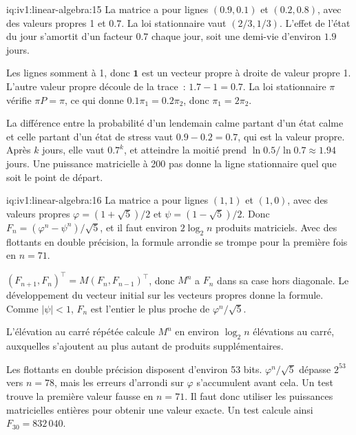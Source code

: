 \begin{solution}{iq:iv1:linear-algebra:15}
La matrice a pour lignes $(0.9, 0.1)$ et $(0.2, 0.8)$, avec des valeurs propres 1 et $0.7$. La loi stationnaire vaut $(2/3, 1/3)$. L'effet de l'état du jour s'amortit d'un facteur $0.7$ chaque jour, soit une demi-vie d'environ $1.9$ jours.

Les lignes somment à 1, donc $\mathbf{1}$ est un vecteur propre à droite de valeur propre 1. L'autre valeur propre découle de la trace~: $1.7 - 1 = 0.7$. La loi stationnaire $\pi$ vérifie $\pi P = \pi$, ce qui donne $0.1\pi_1 = 0.2\pi_2$, donc $\pi_1 = 2\pi_2$.

La différence entre la probabilité d'un lendemain calme partant d'un état calme et celle partant d'un état de stress vaut $0.9 - 0.2 = 0.7$, qui est la valeur propre. Après $k$ jours, elle vaut $0.7^k$, et atteindre la moitié prend $\ln 0.5/\ln 0.7 \approx 1.94$ jours. Une puissance matricielle à 200 pas donne la ligne stationnaire quel que soit le point de départ.

\end{solution}

\begin{solution}{iq:iv1:linear-algebra:16}
La matrice a pour lignes $(1, 1)$ et $(1, 0)$, avec des valeurs propres $\varphi = (1 + \sqrt{5})/2$ et $\psi = (1 - \sqrt{5})/2$. Donc $F_n = (\varphi^n - \psi^n)/\sqrt{5}$, et il faut environ $2\log_2 n$ produits matriciels. Avec des flottants en double précision, la formule arrondie se trompe pour la première fois en $n = 71$.

$(F_{n + 1}, F_n)^\top = M(F_n, F_{n - 1})^\top$, donc $M^n$ a $F_n$ dans sa case hors diagonale. Le développement du vecteur initial sur les vecteurs propres donne la formule. Comme $|\psi| < 1$, $F_n$ est l'entier le plus proche de $\varphi^n/\sqrt{5}$.

L'élévation au carré répétée calcule $M^n$ en environ $\log_2 n$ élévations au carré, auxquelles s'ajoutent au plus autant de produits supplémentaires.

Les flottants en double précision disposent d'environ 53 bits. $\varphi^n/\sqrt{5}$ dépasse $2^{53}$ vers $n = 78$, mais les erreurs d'arrondi sur $\varphi$ s'accumulent avant cela. Un test trouve la première valeur fausse en $n = 71$. Il faut donc utiliser les puissances matricielles entières pour obtenir une valeur exacte. Un test calcule ainsi $F_{30} = 832\,040$.

\end{solution}

